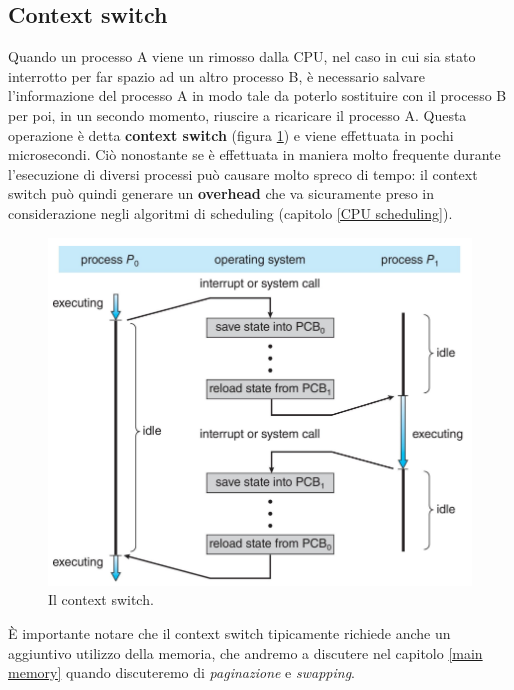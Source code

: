 % 
\subsection{Context switch}\label{context_switch}
Quando un processo A viene un rimosso dalla CPU, nel caso in cui sia stato interrotto per far spazio ad un altro processo B, è necessario salvare l'informazione del processo A in modo tale da poterlo sostituire con il processo B per poi, in un secondo momento, riuscire a ricaricare il processo A. Questa operazione è  detta \textbf{context switch} (figura \ref{fig:context_switch}) e viene effettuata in pochi microsecondi. Ciò nonostante se è effettuata in maniera molto frequente durante l'esecuzione di diversi processi può causare molto spreco di tempo: il context switch può quindi generare un \textbf{overhead} che va sicuramente preso in considerazione negli algoritmi di scheduling (capitolo \ref{CPU scheduling}).
\begin{figure}[h]
    \centering
    \includegraphics[width = .7\textwidth]{../res/imgs/processes/context_switch.png}
    \caption{Il context switch.}
    \label{fig:context_switch}
\end{figure}
È importante notare che il context switch tipicamente richiede anche un aggiuntivo utilizzo della memoria, che andremo a discutere nel capitolo \ref{main memory} quando discuteremo di \textit{paginazione} e \textit{swapping}.

% 
